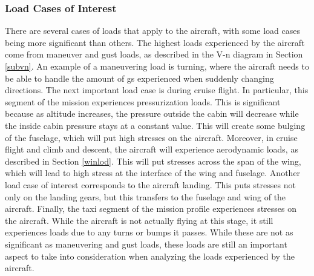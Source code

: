 \subsubsection{Load Cases of Interest}
\label{lcoi}
There are several cases of loads that apply to the aircraft, with some load cases being more significant than others. The highest loads experienced by the aircraft come from maneuver and gust loads, as described in the V-n diagram in Section \ref{subvn}. An example of a maneuvering load is turning, where the aircraft needs to be able to handle the amount of gs experienced when suddenly changing directions. The next important load case is during cruise flight. In particular, this segment of the mission experiences pressurization loads. This is significant because as altitude increases, the pressure outside the cabin will decrease while the inside cabin pressure stays at a constant value. This will create some bulging of the fuselage, which will put high stresses on the aircraft. Moreover, in cruise flight and climb and descent, the aircraft will experience aerodynamic loads, as described in Section \ref{winlod}. This will put stresses across the span of the wing, which will lead to high stress at the interface of the wing and fuselage. Another load case of interest corresponds to the aircraft landing. This puts stresses not only on the landing gears, but this transfers to the fuselage and wing of the aircraft. Finally, the taxi segment of the mission profile experiences stresses on the aircraft. While the aircraft is not actually flying at this stage, it still experiences loads due to any turns or bumps it passes. While these are not as significant as maneuvering and gust loads, these loads are still an important aspect to take into consideration when analyzing the loads experienced by the aircraft.




